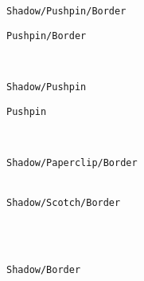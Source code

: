 \documentclass[english,a4paper,11pt]{article}
\begin{document}
\begin{DemoCode}
\hfill\begin{PostItNote}[Render=tikzv2]
\texttt{Shadow/Pushpin/Border}
\end{PostItNote}
\begin{PostItNote}[Shadow=false,Render=tikzv2]
\texttt{Pushpin/Border}
\end{PostItNote}\hfill~

\medskip

\hfill\begin{PostItNote}[Border=false,Render=tikzv2]
\texttt{Shadow/Pushpin}
\end{PostItNote}
\begin{PostItNote}[Border=false,Shadow=false,Render=tikzv2]
\texttt{Pushpin}
\end{PostItNote}\hfill~

\medskip

\hfill\begin{PostItNote}[Pin=Paperclip,Render=tikzv2]
\texttt{Shadow/Paperclip/Border}\\
~
\end{PostItNote}
\begin{PostItNote}[Pin=Scotch,Render=tikzv2]
\texttt{Shadow/Scotch/Border}\\
~
\end{PostItNote}\hfill~

\medskip

\hfill\begin{PostItNote}[Pin=None,Render=tikzv2]
\texttt{Shadow/Border}
\end{PostItNote}\hfill~

\vspace{1cm}

\hfill\begin{PostItNote}[Render=tikzv2,Title={Lipsum[1][1-4]},FontTitle={\large\sffamily},Rotate=5,Color=pink,Height=6cm,Pin=Scotch,AlignV=center,Corner]
\lipsum[1][1-4]
\end{PostItNote}\hfill~
\end{DemoCode}
\end{document}
